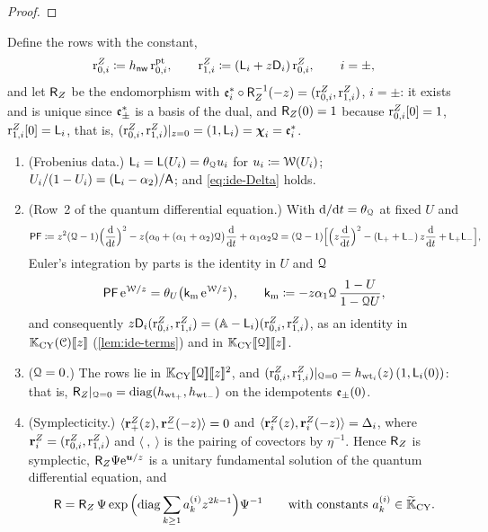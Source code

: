 \begin{proof}
\end{proof}

Define the rows with the constant,
\[
\mathrm{r}^{Z}_{0,i}\coloneqq h_{\mathsf{nw}}\,\mathrm{r}^{\mathrm{pt}}_{0,i},\qquad \mathrm{r}^{Z}_{1,i}\coloneqq(\mathsf{L}_i+z\mathsf{D}_i)\,\mathrm{r}^{Z}_{0,i},\qquad i=\pm,
\]
and let $\mathsf{R}_{Z}$ be the endomorphism with $\mathfrak{e}_i^*\circ\mathsf{R}_{Z}^{-1}(-z)=(\mathrm{r}^{Z}_{0,i},\mathrm{r}^{Z}_{1,i})$, $i=\pm$: it exists and is unique since $\mathfrak{e}_\pm^*$ is a basis of the dual, and $\mathsf{R}_{Z}(0)=1$ because $\mathrm{r}^{Z}_{0,i}[0]=1$, $\mathrm{r}^{Z}_{1,i}[0]=\mathsf{L}_i$, that is, $(\mathrm{r}^{Z}_{0,i},\mathrm{r}^{Z}_{1,i})|_{z=0}=(1,\mathsf{L}_i)=\boldsymbol{\chi}_i=\mathfrak{e}_i^*$.

\begin{prop}
\label{prop:ide-rows}
\begin{enumerate}
\item (Frobenius data.) $\mathsf{L}_i=\mathsf{L}(U_i)=\theta_{\mathcal{Q}} u_i$ for $u_i\coloneqq\mathcal{W}(U_i)$; $U_i/(1-U_i)=(\mathsf{L}_i-\alpha_2)/\mathsf{A}$; and \cref{eq:ide-Delta} holds.
\item (Row~2 of the quantum differential equation.) With $\mathrm{d}/\mathrm{d} t=\theta_{\mathcal{Q}}$ at fixed $U$ and
\begin{equation}
\label{eq:ide-PF}
\mathsf{PF}\coloneqq z^2(\mathcal{Q}-1)\Big(\frac{\mathrm{d}}{\mathrm{d} t}\Big)^2-z\big(\alpha_0+(\alpha_1+\alpha_2)\mathcal{Q}\big)\frac{\mathrm{d}}{\mathrm{d} t}+\alpha_1\alpha_2\mathcal{Q}
=(\mathcal{Q}-1)\Big[\Big(z\frac{\mathrm{d}}{\mathrm{d} t}\Big)^2-(\mathsf{L}_++\mathsf{L}_-)\,z\frac{\mathrm{d}}{\mathrm{d} t}+\mathsf{L}_+\mathsf{L}_-\Big],
\end{equation}
Euler's integration by parts is the identity in $U$ and $\mathcal{Q}$
\begin{equation}
\label{eq:ide-euler}
\mathsf{PF}\,\mathrm{e}^{\mathcal{W}/z}=\theta_{U}\big(\mathsf{k}_{\mathrm{m}}\,\mathrm{e}^{\mathcal{W}/z}\big),\qquad\mathsf{k}_{\mathrm{m}}\coloneqq-z\alpha_1\mathcal{Q}\,\frac{1-U}{1-\mathcal{Q} U},
\end{equation}
and consequently $z\mathsf{D}_i(\mathrm{r}^{Z}_{0,i},\mathrm{r}^{Z}_{1,i})=(\mathbb{A}-\mathsf{L}_i)(\mathrm{r}^{Z}_{0,i},\mathrm{r}^{Z}_{1,i})$, as an identity in $\mathbb{K}_{\mathrm{CY}}(\mathcal{C})[\![ z ]\!]$ (\cref{lem:ide-terms}) and in $\mathbb{K}_{\mathrm{CY}}[\![ \mathcal{Q} ]\!][\![ z ]\!]$.
\item ($\mathcal{Q}=0$.) The rows lie in $\mathbb{K}_{\mathrm{CY}}[\![ \mathcal{Q} ]\!][\![ z ]\!]^2$, and $(\mathrm{r}^{Z}_{0,i},\mathrm{r}^{Z}_{1,i})|_{\mathcal{Q}=0}=h_{\mathrm{wt}_i}(z)\,(1,\mathsf{L}_i(0))$: that is, $\mathsf{R}_{Z}|_{\mathcal{Q}=0}=\mathrm{diag}(h_{\mathrm{wt}_+},h_{\mathrm{wt}_-})$ on the idempotents $\mathfrak{e}_\pm(0)$.
\item (Symplecticity.) $\langle\mathbf{r}^Z_+(z),\mathbf{r}^Z_-(-z)\rangle=0$ and $\langle\mathbf{r}^Z_i(z),\mathbf{r}^Z_i(-z)\rangle=\Delta_i$, where $\mathbf{r}^Z_i=(\mathrm{r}^{Z}_{0,i},\mathrm{r}^{Z}_{1,i})$ and $\langle\ ,\ \rangle$ is the pairing of covectors by $\eta^{-1}$. Hence $\mathsf{R}_{Z}$ is symplectic, $\mathsf{R}_{Z}\Psi\mathrm{e}^{\boldsymbol{u}/z}$ is a unitary fundamental solution of the quantum differential equation, and
\[
\mathsf{R}=\mathsf{R}_{Z}\,\Psi\exp\Big(\mathrm{diag}\sum_{k\geq 1}a_k^{(i)}z^{2k-1}\Big)\Psi^{-1}\qquad\text{with constants }a_k^{(i)}\in\widetilde{\mathbb{K}}_{\mathrm{CY}} .
\]
\end{enumerate}
\end{prop}
